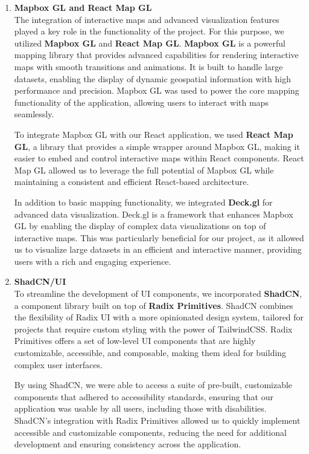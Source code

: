 \begin{enumerate}
    \item \textbf{Mapbox GL and React Map GL} \\
    The integration of interactive maps and advanced visualization features played a key role in the functionality of the project. For this purpose, we utilized \textbf{Mapbox GL} and \textbf{React Map GL}. \textbf{Mapbox GL} is a powerful mapping library that provides advanced capabilities for rendering interactive maps with smooth transitions and animations. It is built to handle large datasets, enabling the display of dynamic geospatial information with high performance and precision. Mapbox GL was used to power the core mapping functionality of the application, allowing users to interact with maps seamlessly.

    To integrate Mapbox GL with our React application, we used \textbf{React Map GL}, a library that provides a simple wrapper around Mapbox GL, making it easier to embed and control interactive maps within React components. React Map GL allowed us to leverage the full potential of Mapbox GL while maintaining a consistent and efficient React-based architecture.

    In addition to basic mapping functionality, we integrated \textbf{Deck.gl} for advanced data visualization. Deck.gl is a framework that enhances Mapbox GL by enabling the display of complex data visualizations on top of interactive maps. This was particularly beneficial for our project, as it allowed us to visualize large datasets in an efficient and interactive manner, providing users with a rich and engaging experience.

    \item \textbf{ShadCN/UI} \\
    To streamline the development of UI components, we incorporated \textbf{ShadCN}, a component library built on top of \textbf{Radix Primitives}. ShadCN combines the flexibility of Radix UI with a more opinionated design system, tailored for projects that require custom styling with the power of TailwindCSS. Radix Primitives offers a set of low-level UI components that are highly customizable, accessible, and composable, making them ideal for building complex user interfaces.

    By using ShadCN, we were able to access a suite of pre-built, customizable components that adhered to accessibility standards, ensuring that our application was usable by all users, including those with disabilities. ShadCN's integration with Radix Primitives allowed us to quickly implement accessible and customizable components, reducing the need for additional development and ensuring consistency across the application.


\end{enumerate}
